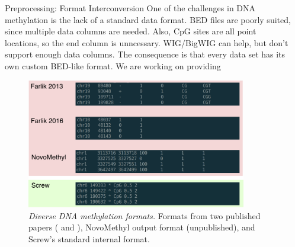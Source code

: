 \documentclass{beamer}
\begin{document}
\begin{frame}
\begin{columns}[t]
\begin{column}{.32\textwidth}
\begin{block}{Preprocessing: Format Interconversion}
	One of the challenges in DNA methylation is the lack of a standard data format. BED files are poorly suited, since multiple data columns are needed. Also, CpG sites are all point locations, so the end column is unncessary. WIG/BigWIG can help, but don't support enough data columns. The consequence is that every data set has its own custom BED-like format. We are working on providing 
\begin{figure}
\begin{center}
\includegraphics[width=0.9\textwidth]{figures/data_types.pdf}
\caption{\textit{Diverse DNA methylation formats.} Formats from two published papers (\cite{Farlik2013} and \cite{Farlik2016}), NovoMethyl output format (unpublished), and Screw's standard internal format.}
\end{center}
\end{figure}

\end{block}




\end{column}


\begin{column}{.65\textwidth}
\vspace*{-\baselineskip}
  \begin{columns}[t,totalwidth=\textwidth]
    \begin{column}{.48\textwidth}
    
	
	\end{column}


\end{columns}
\end{column}
\end{columns}
\end{frame}
\end{document}
